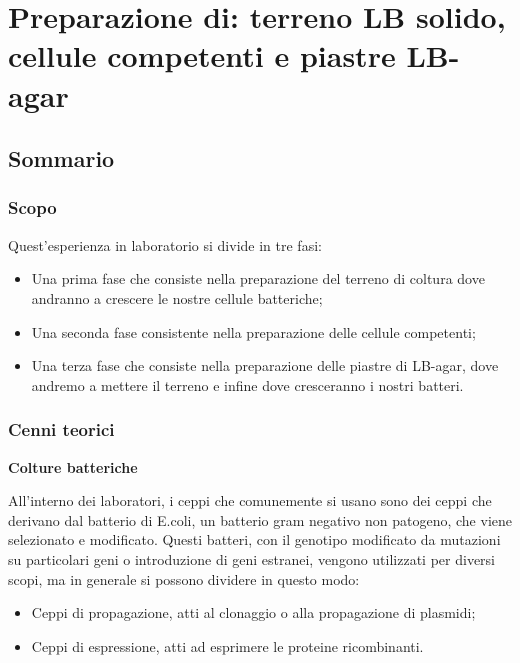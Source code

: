\chapter{Preparazione di:  terreno LB solido, cellule competenti e piastre LB-agar }

\vspace{0.6cm}


\section{Sommario}

\subsection{Scopo}

Quest'esperienza in laboratorio si divide in tre fasi:
\begin{itemize}
  \item Una prima fase che consiste nella preparazione del terreno di coltura dove
  andranno a crescere le nostre cellule batteriche;
  \item Una seconda fase consistente nella preparazione delle cellule competenti;
  \item Una terza fase che consiste nella preparazione delle piastre di LB-agar,
  dove andremo a mettere il terreno e infine dove cresceranno i nostri batteri.
\end{itemize}


\subsection{Cenni teorici}

\textbf{Colture batteriche}
\vspace{0.3cm}

All'interno dei laboratori, i ceppi che comunemente si usano sono dei ceppi
che derivano dal batterio di E.coli, un batterio gram negativo non patogeno,
che viene selezionato e modificato.
Questi batteri, con il genotipo modificato da mutazioni su particolari geni o introduzione
di geni estranei, vengono utilizzati per diversi scopi, ma in generale si possono dividere in questo modo:
\begin{itemize}
  \item Ceppi di propagazione, atti al clonaggio o alla propagazione di plasmidi;
  \item Ceppi di espressione, atti ad esprimere le proteine ricombinanti.
\end{itemize}

